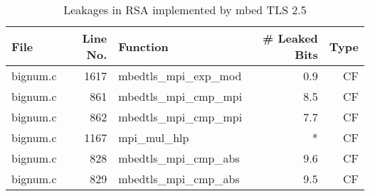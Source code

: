 \begin{table}[!ht]
\centering\tiny\scriptsize
\caption{Leakages in RSA implemented by mbed TLS 2.5}\label{tab:RSAmbed TLS2.5}
\begin{tabular}{lrlrr}
\hline
\textbf{File} & \textbf{Line No.} & \textbf{Function} & \textbf{\# Leaked Bits} & \textbf{Type} \\\hline
bignum.c& 1617&mbedtls\_mpi\_exp\_mod&0.9 &CF\\
bignum.c& 861&mbedtls\_mpi\_cmp\_mpi&8.5 &CF\\
bignum.c& 862&mbedtls\_mpi\_cmp\_mpi&7.7 &CF\\
bignum.c& 1167&mpi\_mul\_hlp&*&CF\\
bignum.c& 828&mbedtls\_mpi\_cmp\_abs&9.6 &CF\\
bignum.c& 829&mbedtls\_mpi\_cmp\_abs&9.5 &CF\\
\hline
\end{tabular}
\renewcommand{\baselinestretch}{1.0}\selectfont
\end{table}
